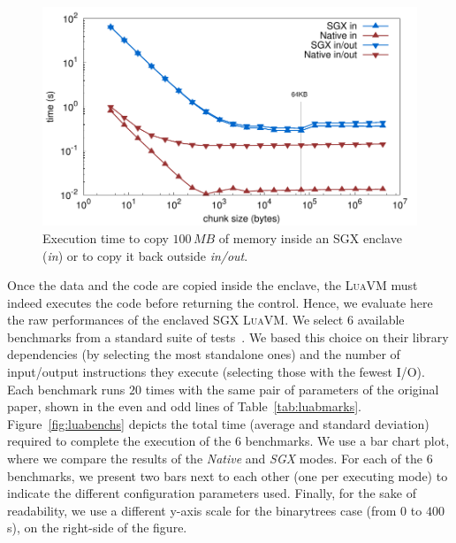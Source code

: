 \begin{figure}[t!]
  \centering
  \includegraphics[width=\linewidth]{plots/memcpy/memcpy}
  \caption{Execution time to copy $100\,MB$ of memory inside an SGX enclave (\emph{in}) or to copy it back outside {\emph{in/out}.} }
  \label{fig:sgxmemcpy}
\end{figure}

Once the data and the code are copied inside the enclave, the \textsc{LuaVM} must indeed executes the code before returning the control.
Hence, we evaluate here the raw performances of the enclaved SGX \textsc{LuaVM}.
We select $6$ available benchmarks from a standard suite of tests~\cite{bolz2015}.
We based this choice on their library dependencies (by selecting the most standalone ones) and the number of input/output instructions they execute (selecting those with the fewest I/O).
Each benchmark runs $20$ times with the same pair of parameters of the original paper, shown in the even and odd lines of Table~\ref{tab:luabmarks}.
Figure~\ref{fig:luabenchs} depicts the total time (average and standard deviation) required to complete the execution of the $6$ benchmarks.
We use a bar chart plot, where we compare the results of the \emph{Native} and \emph{SGX} modes.
For each of the $6$ benchmarks, we present two bars next to each other (one per executing mode) to indicate the different configuration parameters used.
Finally, for the sake of readability, we use a different y-axis scale for the \textsf{binarytrees} case (from $0$ to $400$\,s), on the right-side of the figure.

